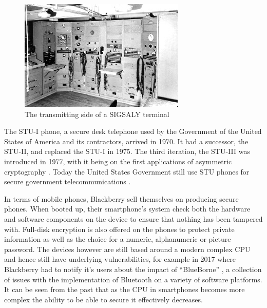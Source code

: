 \begin{figure}
	\includegraphics[width=\linewidth]{terminal.jpg}
	\caption{The transmitting side of a SIGSALY terminal \citep{RN21}}
	\label{fig:SIGSALY}
\end{figure}

The STU-I phone, a secure desk telephone used by the Government of the United States of America and its contractors, arrived in 1970.
It had a successor, the STU-II, and replaced the STU-I in 1975.
The third iteration, the STU-III was introduced in 1977, with it being on the first applications of asymmetric cryptography \citep{RN30}.
Today the United States Government still use STU phones for secure government telecommunications \citep{RN30}.

In terms of mobile phones, Blackberry sell themselves on producing secure phones.
When booted up, their smartphone’s system check both the hardware and software components on the device to ensure that nothing has been tampered with.
Full-disk encryption is also offered on the phones to protect private information as well as the choice for a numeric, alphanumeric or picture password.
The devices however are still based around a modern complex CPU and hence still have underlying vulnerabilities, for example in 2017 where Blackberry had to notify it’s users about the impact of “BlueBorne” \citep{RN20}, a collection of issues with the implementation of Bluetooth on a variety of software platforms. 
	It can be seen from the past that as the CPU in smartphones becomes more complex the ability to be able to secure it effectively decreases. 


